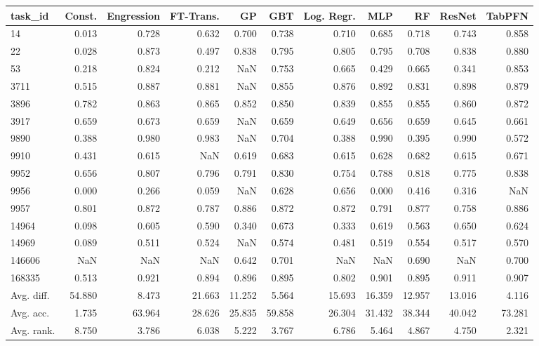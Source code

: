 \begin{tabular}{lrrrrrrrrrr}
\toprule
task\_id & Const. & Engression & FT-Trans. & GP & GBT & Log. Regr. & MLP & RF & ResNet & TabPFN \\
\midrule
14 & 0.013 & 0.728 & 0.632 & 0.700 & 0.738 & 0.710 & 0.685 & 0.718 & 0.743 & 0.858 \\
22 & 0.028 & 0.873 & 0.497 & 0.838 & 0.795 & 0.805 & 0.795 & 0.708 & 0.838 & 0.880 \\
53 & 0.218 & 0.824 & 0.212 & NaN & 0.753 & 0.665 & 0.429 & 0.665 & 0.341 & 0.853 \\
3711 & 0.515 & 0.887 & 0.881 & NaN & 0.855 & 0.876 & 0.892 & 0.831 & 0.898 & 0.879 \\
3896 & 0.782 & 0.863 & 0.865 & 0.852 & 0.850 & 0.839 & 0.855 & 0.855 & 0.860 & 0.872 \\
3917 & 0.659 & 0.673 & 0.659 & NaN & 0.659 & 0.649 & 0.656 & 0.659 & 0.645 & 0.661 \\
9890 & 0.388 & 0.980 & 0.983 & NaN & 0.704 & 0.388 & 0.990 & 0.395 & 0.990 & 0.572 \\
9910 & 0.431 & 0.615 & NaN & 0.619 & 0.683 & 0.615 & 0.628 & 0.682 & 0.615 & 0.671 \\
9952 & 0.656 & 0.807 & 0.796 & 0.791 & 0.830 & 0.754 & 0.788 & 0.818 & 0.775 & 0.838 \\
9956 & 0.000 & 0.266 & 0.059 & NaN & 0.628 & 0.656 & 0.000 & 0.416 & 0.316 & NaN \\
9957 & 0.801 & 0.872 & 0.787 & 0.886 & 0.872 & 0.872 & 0.791 & 0.877 & 0.758 & 0.886 \\
14964 & 0.098 & 0.605 & 0.590 & 0.340 & 0.673 & 0.333 & 0.619 & 0.563 & 0.650 & 0.624 \\
14969 & 0.089 & 0.511 & 0.524 & NaN & 0.574 & 0.481 & 0.519 & 0.554 & 0.517 & 0.570 \\
146606 & NaN & NaN & NaN & 0.642 & 0.701 & NaN & NaN & 0.690 & NaN & 0.700 \\
168335 & 0.513 & 0.921 & 0.894 & 0.896 & 0.895 & 0.802 & 0.901 & 0.895 & 0.911 & 0.907 \\
Avg. diff. & 54.880 & 8.473 & 21.663 & 11.252 & 5.564 & 15.693 & 16.359 & 12.957 & 13.016 & 4.116 \\
Avg. acc. & 1.735 & 63.964 & 28.626 & 25.835 & 59.858 & 26.304 & 31.432 & 38.344 & 40.042 & 73.281 \\
Avg. rank. & 8.750 & 3.786 & 6.038 & 5.222 & 3.767 & 6.786 & 5.464 & 4.867 & 4.750 & 2.321 \\
\bottomrule
\end{tabular}
